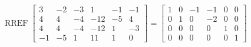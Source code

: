\begin{exerciseAnswer} 


\[\operatorname{RREF} \left[\begin{array}{cccccc}
3 & -2 & -3 & 1 & -1 & -1 \\
4 & 4 & -4 & -12 & -5 & 4 \\
4 & 4 & -4 & -12 & 1 & -3 \\
-1 & -5 & 1 & 11 & 1 & 0
\end{array}\right] = \left[\begin{array}{cccccc}
1 & 0 & -1 & -1 & 0 & 0 \\
0 & 1 & 0 & -2 & 0 & 0 \\
0 & 0 & 0 & 0 & 1 & 0 \\
0 & 0 & 0 & 0 & 0 & 1
\end{array}\right] \]



\end{exerciseAnswer}

